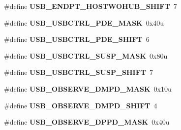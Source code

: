 \begin{DoxyCompactItemize}
\item 
\#define {\bfseries U\+S\+B\+\_\+\+E\+N\+D\+P\+T\+\_\+\+H\+O\+S\+T\+W\+O\+H\+U\+B\+\_\+\+S\+H\+I\+FT}~7\hypertarget{group__USB__Register__Masks_ga3d502bcb3115f9bc7918b5fc67d42337}{}\label{group__USB__Register__Masks_ga3d502bcb3115f9bc7918b5fc67d42337}

\item 
\#define {\bfseries U\+S\+B\+\_\+\+U\+S\+B\+C\+T\+R\+L\+\_\+\+P\+D\+E\+\_\+\+M\+A\+SK}~0x40u\hypertarget{group__USB__Register__Masks_ga7fb8345a32022ec5df5129278d1aed30}{}\label{group__USB__Register__Masks_ga7fb8345a32022ec5df5129278d1aed30}

\item 
\#define {\bfseries U\+S\+B\+\_\+\+U\+S\+B\+C\+T\+R\+L\+\_\+\+P\+D\+E\+\_\+\+S\+H\+I\+FT}~6\hypertarget{group__USB__Register__Masks_gaaf556df66acd4f6ff2bc1f4fad1a05ed}{}\label{group__USB__Register__Masks_gaaf556df66acd4f6ff2bc1f4fad1a05ed}

\item 
\#define {\bfseries U\+S\+B\+\_\+\+U\+S\+B\+C\+T\+R\+L\+\_\+\+S\+U\+S\+P\+\_\+\+M\+A\+SK}~0x80u\hypertarget{group__USB__Register__Masks_gac65859ca12bfe997afc67545c8b1a052}{}\label{group__USB__Register__Masks_gac65859ca12bfe997afc67545c8b1a052}

\item 
\#define {\bfseries U\+S\+B\+\_\+\+U\+S\+B\+C\+T\+R\+L\+\_\+\+S\+U\+S\+P\+\_\+\+S\+H\+I\+FT}~7\hypertarget{group__USB__Register__Masks_ga44772d68648a57e6341ceec7fd5268f3}{}\label{group__USB__Register__Masks_ga44772d68648a57e6341ceec7fd5268f3}

\item 
\#define {\bfseries U\+S\+B\+\_\+\+O\+B\+S\+E\+R\+V\+E\+\_\+\+D\+M\+P\+D\+\_\+\+M\+A\+SK}~0x10u\hypertarget{group__USB__Register__Masks_ga796850497f75cc88772d3826d1196a43}{}\label{group__USB__Register__Masks_ga796850497f75cc88772d3826d1196a43}

\item 
\#define {\bfseries U\+S\+B\+\_\+\+O\+B\+S\+E\+R\+V\+E\+\_\+\+D\+M\+P\+D\+\_\+\+S\+H\+I\+FT}~4\hypertarget{group__USB__Register__Masks_ga044fcfc292ba6db33ec4e847a6510440}{}\label{group__USB__Register__Masks_ga044fcfc292ba6db33ec4e847a6510440}

\item 
\#define {\bfseries U\+S\+B\+\_\+\+O\+B\+S\+E\+R\+V\+E\+\_\+\+D\+P\+P\+D\+\_\+\+M\+A\+SK}~0x40u\hypertarget{group__USB__Register__Masks_ga8368ad607c0f5a0ab499734e26f36aad}{}\label{group__USB__Register__Masks_ga8368ad607c0f5a0ab499734e26f36aad}


\end{DoxyCompactItemize}
